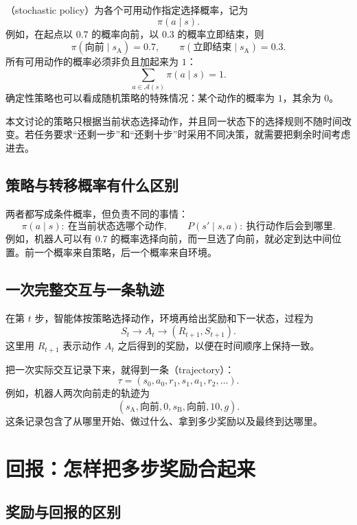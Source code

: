 \documentclass[UTF8]{ctexart}
\begin{document}
（stochastic policy）为各个可用动作指定选择概率，记为
\[
  \pi(a\mid s).
\]
例如，在起点以 $0.7$ 的概率向前，以 $0.3$ 的概率立即结束，则
\[
  \pi(\text{向前}\mid s_{\mathrm A})=0.7,
  \qquad
  \pi(\text{立即结束}\mid s_{\mathrm A})=0.3.
\]
所有可用动作的概率必须非负且加起来为 $1$：
\begin{equation}
  \sum_{a\in\mathcal A(s)}\pi(a\mid s)=1.
  \label{eq:mdp-policy-sum}
\end{equation}
确定性策略也可以看成随机策略的特殊情况：某个动作的概率为 $1$，其余为 $0$。

本文讨论的策略只根据当前状态选择动作，并且同一状态下的选择规则不随时间改变。若任务要求“还剩一步”和“还剩十步”时采用不同决策，就需要把剩余时间考虑进去。

\subsection{策略与转移概率有什么区别}

两者都写成条件概率，但负责不同的事情：
\[
  \pi(a\mid s):\ \text{在当前状态选哪个动作},
  \qquad
  P(s'\mid s,a):\ \text{执行动作后会到哪里}.
\]
例如，机器人可以有 $0.7$ 的概率选择向前，而一旦选了向前，就必定到达中间位置。前一个概率来自策略，后一个概率来自环境。

\subsection{一次完整交互与一条轨迹}

在第 $t$ 步，智能体按策略选择动作，环境再给出奖励和下一状态，过程为
\begin{equation}
  S_t\longrightarrow A_t\longrightarrow(R_{t+1},S_{t+1}).
  \label{eq:mdp-interaction}
\end{equation}
这里用 $R_{t+1}$ 表示动作 $A_t$ 之后得到的奖励，以便在时间顺序上保持一致。

把一次实际交互记录下来，就得到一条（trajectory）：
\[
  \tau=(s_0,a_0,r_1,s_1,a_1,r_2,\ldots).
\]
例如，机器人两次向前走的轨迹为
\[
  (s_{\mathrm A},\text{向前},0,s_{\mathrm B},\text{向前},10,g).
\]
这条记录包含了从哪里开始、做过什么、拿到多少奖励以及最终到达哪里。

\section{回报：怎样把多步奖励合起来}
\label{sec:mdp-return}

\subsection{奖励与回报的区别}
\end{document}
